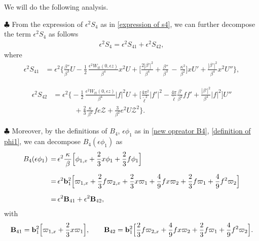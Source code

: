 \documentclass[10pt, reqno]{amsart}
\numberwithin{equation}{section}
\theoremstyle{definition}
\begin{document}
{{We will do the following analysis.

\smallskip\noindent $\clubsuit$
From the expression of $\epsilon^2 S_4$ as in \eqref{expression of s4}, we can further decompose the term $\epsilon^2S_4$ as follows
\begin{align} \label{decompose S3+S4}
\epsilon^2 S_4 = \epsilon^2 S_{41} + \epsilon^2 S_{42},
\end{align}
where
\begin{align}\label{barS41}
 \epsilon^2 S_{41}& =\epsilon^2\Bigg\{
\frac{\beta''}{\beta^3}U
-
\frac{1}{2}\, \frac{\epsilon^2W_{tt}(0, \epsilon z)}{\beta^4} x^2U
+\Big[\frac{2|\beta'|^2}{\beta^4}
+\frac{\beta''} {\beta^3}
\,-\,\frac{\kappa^2}{\beta^2}
\Big]xU'
+
\frac{|\beta'|^2}{\beta^4} x^2 U''
\Bigg\},
\end{align}

\begin{align}\label{barS42}
 \epsilon^2 S_{42}& =\epsilon^2\Bigg\{
-\frac{1}{2}\, \frac{ \epsilon^2W_{tt}(0, \epsilon z)}{\beta^4}|f|^2 U
+
\Big[\frac{4\pi^2}{{\tilde\ell}^2}|f'|^2
-\frac{4\pi}{{\tilde\ell}}\frac{\beta'}{\beta^2}ff'
+\frac{|\beta'|^2}{\beta^4} |f|^2
\Big]U''
\nonumber\\[2mm]
 &\qquad\quad
+\frac 23 \frac{\kappa}{\, \beta^2\, } fe{\mathcal Z}
+\frac3{\beta^2}e^2U{\mathcal Z}^2
\Bigg\}.
\end{align}

\smallskip\noindent $\clubsuit$
Moreover, by the definitions of $B_4$, $\epsilon \phi_{1}$ as  in \eqref{new opreator B4}, \eqref{definition of phi1}, we can decompose $ B_4(\epsilon\phi_1)$ as
\begin{align}\label{B4phi1}
 B_4(\epsilon\phi_1)
\,=\,& \epsilon^2 \frac{\kappa}{\, \beta\, } \Big[ \phi_{1,x} + \frac{2}{3}x\phi_1+\frac{2}{3}f\phi_1\Big]
\nonumber\\[2mm]
\,=\,&\epsilon^2 {\mathbf b}_1^2\Big[
\varpi_{1,x}
+ \frac{2}{3}f\varpi_{2,x}
+\frac{2}{3}x\varpi_1
+ \frac{4}{9} f x\varpi_2
+\frac{2}{3}f\varpi_1
 + \frac{4}{9} f^2\varpi_2
 \Big]
\nonumber\\[2mm]
\,=\,& \epsilon^2 {\bf B}_{41} +\epsilon^2{\bf B}_{42},
\end{align}
with
\begin{align} \label{B42}
{\bf B}_{41} =
 {\mathbf b}_1^2\Big[
\varpi_{1,x}
+\frac{2}{3}x\varpi_1
\Big],\qquad
{\bf B}_{42} =
 {\mathbf b}_1^2\Big[
\frac{2}{3}f\varpi_{2,x}
+ \frac{4}{9} f x\varpi_2
+\frac{2}{3}f\varpi_1
+ \frac{4}{9} f^2\varpi_2
\Big].
\end{align}


}}
\end{document}
